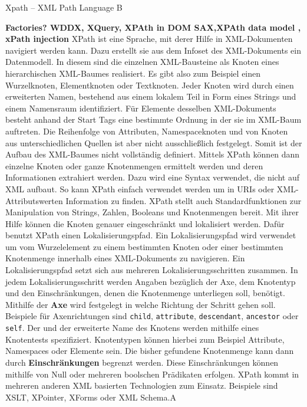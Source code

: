 Xpath – XML Path Language B

\textbf{Factories? WDDX, XQuery, XPAth in DOM SAX,XPAth data model , xPath injection}
XPath ist eine Sprache, mit derer Hilfe in XML-Dokumenten navigiert werden kann. Dazu erstellt sie aus dem Infoset des XML-Dokuments ein Datenmodell. In diesem sind die einzelnen XML-Bausteine als  Knoten eines hierarchischen XML-Baumes realisiert. Es gibt also zum Beispiel einen Wurzelknoten, Elementknoten oder Textknoten. Jeder Knoten wird durch einen erweiterten Namen, bestehend aus einem lokalem Teil in Form eines Strings und einem Namensraum  identifiziert. Für Elemente desselben XML-Dokuments besteht anhand der Start Tags eine bestimmte Ordnung in der sie im XML-Baum auftreten. Die Reihenfolge von Attributen, Namespaceknoten und von Knoten aus unterschiedlichen Quellen ist aber nicht  ausschließlich festgelegt. Somit ist der Aufbau des XML-Baumes nicht vollständig definiert. 
Mittels XPath können dann einzelne Knoten oder ganze Knotenmengen ermittelt werden und deren Informationen extrahiert werden. Dazu wird eine Syntax verwendet, die nicht auf XML aufbaut. So kann XPath einfach verwendet werden um in URIs oder XML-Attributswerten Information zu finden.  XPath stellt auch Standardfunktionen zur Manipulation von Strings, Zahlen, Booleans und Knotenmengen bereit. Mit ihrer Hilfe können die Knoten genauer eingeschränkt und lokalisiert werden. Dafür benutzt XPath einen Lokalisierungspfad.
Ein Lokalisierungspfad wird verwendet um vom Wurzelelement zu einem bestimmten Knoten oder einer bestimmten Knotenmenge innerhalb eines XML-Dokuments zu navigieren. Ein Lokalisierungspfad setzt sich aus mehreren Lokalisierungsschritten zusammen. In jedem Lokalisierungsschritt werden Angaben bezüglich der Axe, dem Knotentyp und den Einschränkungen, denen die Knotenmenge unterliegen soll, benötigt. 
Mithilfe der \textbf{Axe} wird festgelegt in welche Richtung der Schritt gehen soll. Beispiele für Axenrichtungen sind \texttt{child}, \texttt{attribute}, \texttt{descendant}, \texttt{ancestor} oder \texttt{self}.
Der  und der erweiterte Name des Knotens werden mithilfe eines Knotentests spezifiziert. Knotentypen können hierbei zum Beispiel Attribute, Namespaces oder Elemente sein.
Die bisher gefundene Knotenmenge kann dann durch \textbf{Einschränkungen} begrenzt werden.  Diese Einschränkungen können mithilfe von Null oder mehreren boolschen Prädikaten erfolgen.
XPath kommt in mehreren anderen XML basierten Technologien zum Einsatz. Beispiele sind XSLT, XPointer, XForms oder XML Schema.A



